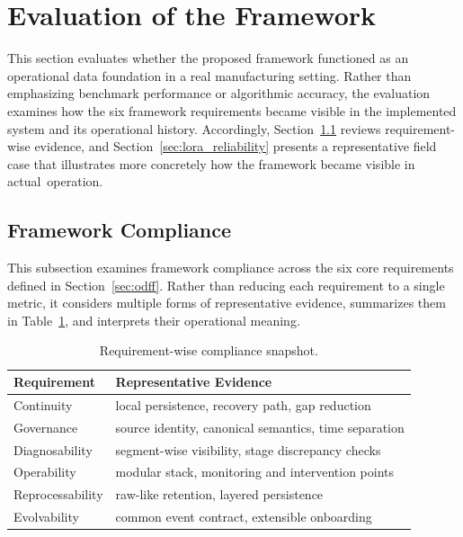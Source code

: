 \documentclass[systems,article,accept,pdftex,moreauthors]{Definitions/mdpi}
\begin{document}
\section{Evaluation of the Framework}
\label{sec:framework_evaluation}

This section evaluates whether the proposed framework functioned as an operational data foundation in a real manufacturing setting. Rather than emphasizing benchmark performance or algorithmic accuracy, the evaluation examines how the six framework requirements became visible in the implemented system and its operational history. Accordingly, Section~\ref{sec:framework_compliance} reviews requirement-wise evidence, and Section~\ref{sec:lora_reliability} presents a representative field case that illustrates more concretely how the framework became visible in \mbox{actual operation}.


\subsection{Framework Compliance}
\label{sec:framework_compliance}

This subsection examines framework compliance across the six core requirements defined in Section~\ref{sec:odff}. Rather than reducing each requirement to a single metric, it considers multiple forms of representative evidence, summarizes them in Table~\ref{tab:requirement_compliance_snapshot}, and interprets their operational meaning.


\begin{table}[H]
\caption{Requirement-wise compliance snapshot.\label{tab:requirement_compliance_snapshot}}
\renewcommand{\arraystretch}{1.15}
\begin{tabularx}{\textwidth}{
>{\raggedright\arraybackslash}p{}
>{\raggedright\arraybackslash}X}
\toprule
\textbf{Requirement} & \textbf{Representative Evidence} \\
\midrule

Continuity
& local persistence, recovery path, gap reduction \\

Governance
& source identity, canonical semantics, time separation \\

Diagnosability
& segment-wise visibility, stage discrepancy checks \\

Operability
& modular stack, monitoring and intervention points \\

Reprocessability
& raw-like retention, layered persistence \\

Evolvability
& common event contract, extensible onboarding \\

\bottomrule
\end{tabularx}
\renewcommand{\arraystretch}{1.0}
\end{table}
\end{document}
